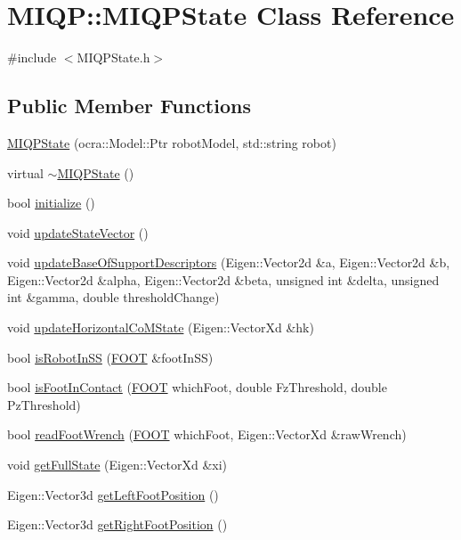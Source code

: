 \hypertarget{classMIQP_1_1MIQPState}{\section{\-M\-I\-Q\-P\-:\-:\-M\-I\-Q\-P\-State \-Class \-Reference}
\label{classMIQP_1_1MIQPState}
}


{\ttfamily \#include $<$\-M\-I\-Q\-P\-State.\-h$>$}

\subsection*{\-Public \-Member \-Functions}
\begin{DoxyCompactItemize}
\item 
\hyperlink{classMIQP_1_1MIQPState_a85031fb1a8bca02c253f8669aba70f09}{\-M\-I\-Q\-P\-State} (ocra\-::\-Model\-::\-Ptr robot\-Model, std\-::string robot)
\item 
virtual \hyperlink{classMIQP_1_1MIQPState_a1f2f14c183d11b3a1e323b59fe47020b}{$\sim$\-M\-I\-Q\-P\-State} ()
\item 
bool \hyperlink{classMIQP_1_1MIQPState_adbae9a43d4d510e0873995bf0016d75a}{initialize} ()
\item 
void \hyperlink{classMIQP_1_1MIQPState_a149d9bd8fd8208734e66a5f945cfe39a}{update\-State\-Vector} ()
\item 
void \hyperlink{classMIQP_1_1MIQPState_a8dec06cabde0ad186c976c0bc61c4688}{update\-Base\-Of\-Support\-Descriptors} (\-Eigen\-::\-Vector2d \&a, \-Eigen\-::\-Vector2d \&b, \-Eigen\-::\-Vector2d \&alpha, \-Eigen\-::\-Vector2d \&beta, unsigned int \&delta, unsigned int \&gamma, double threshold\-Change)
\item 
void \hyperlink{classMIQP_1_1MIQPState_a91a2e7b0415bf56fdb26625eacf106ef}{update\-Horizontal\-Co\-M\-State} (\-Eigen\-::\-Vector\-Xd \&hk)
\item 
bool \hyperlink{classMIQP_1_1MIQPState_ac098f6c3e6b585c45a5dc24d455f15c2}{is\-Robot\-In\-S\-S} (\hyperlink{utils_8h_a4b6a8e135f90bd56e5a57a60efb42529}{\-F\-O\-O\-T} \&foot\-In\-S\-S)
\item 
bool \hyperlink{classMIQP_1_1MIQPState_abc509a2d35f1d97a9ebcd1352943dadc}{is\-Foot\-In\-Contact} (\hyperlink{utils_8h_a4b6a8e135f90bd56e5a57a60efb42529}{\-F\-O\-O\-T} which\-Foot, double \-Fz\-Threshold, double \-Pz\-Threshold)
\item 
bool \hyperlink{classMIQP_1_1MIQPState_a3710c3ded4a5da84c505ee8e052021a3}{read\-Foot\-Wrench} (\hyperlink{utils_8h_a4b6a8e135f90bd56e5a57a60efb42529}{\-F\-O\-O\-T} which\-Foot, \-Eigen\-::\-Vector\-Xd \&raw\-Wrench)
\item 
void \hyperlink{classMIQP_1_1MIQPState_ae1d43385c4b25dced6952ffdfbf5043a}{get\-Full\-State} (\-Eigen\-::\-Vector\-Xd \&xi)
\item 
\-Eigen\-::\-Vector3d \hyperlink{classMIQP_1_1MIQPState_a7a6c0d1fc5b3fb66d321867f9618e013}{get\-Left\-Foot\-Position} ()
\item 
\-Eigen\-::\-Vector3d \hyperlink{classMIQP_1_1MIQPState_afd73d24a2c94e32686160874c66b6b55}{get\-Right\-Foot\-Position} ()
\end{DoxyCompactItemize}
